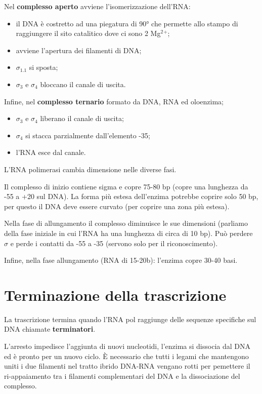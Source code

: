 \documentclass[11pt]{book}
\begin{document}
Nel \textbf{complesso aperto} avviene l'isomerizzazione dell'RNA:

\begin{itemize}
\itemsep1pt\parskip0pt
\item
  il DNA è costretto ad una piegatura di 90° che permette allo stampo di
  raggiungere il sito catalitico dove ci sono 2 Mg\(^2\)\(^+\);
\item
  avviene l'apertura dei filamenti di DNA;
\item
  \(\sigma\)\(_1.1\) si sposta;
\item
  \(\sigma\)\(_3\) e \(\sigma\)\(_4\) bloccano il canale di uscita.
\end{itemize}

Infine, nel \textbf{complesso ternario} formato da DNA, RNA ed
oloenzima;

\begin{itemize}
\itemsep1pt\parskip0pt
\item
  \(\sigma\)\(_3\) e \(\sigma\)\(_4\) liberano il canale di uscita;
\item
  \(\sigma\)\(_4\) si stacca parzialmente dall'elemento -35;
\item
  l'RNA esce dal canale.
\end{itemize}

L'RNA polimerasi cambia dimensione nelle diverse fasi.

Il complesso di inizio contiene sigma e copre 75-80 bp (copre una
lunghezza da -55 a +20 sul DNA). La forma più estesa dell'enzima
potrebbe coprire solo 50 bp, per questo il DNA deve essere curvato (per
coprire una zona più estesa).

Nella fase di allungamento il complesso diminuisce le sue dimensioni
(parliamo della fase iniziale in cui l'RNA ha una lunghezza di circa di
10 bp). Può perdere \(\sigma\) e perde i contatti da -55 a -35 (servono
solo per il riconoscimento).

Infine, nella fase allungamento (RNA di 15-20b): l'enzima copre 30-40
basi.

\section{Terminazione della
trascrizione}\label{terminazione-della-trascrizione}

La trascrizione termina quando l'RNA pol raggiunge delle sequenze
specifiche sul DNA chiamate \textbf{terminatori}.

L'arresto impedisce l'aggiunta di nuovi nucleotidi, l'enzima si dissocia
dal DNA ed è pronto per un nuovo ciclo. È necessario che tutti i legami
che mantengono uniti i due filamenti nel tratto ibrido DNA-RNA vengano
rotti per pemettere il ri-appaiamento tra i filamenti complementari del
DNA e la dissociazione del complesso.
\end{document}
